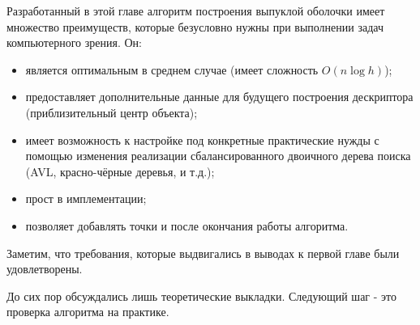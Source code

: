 Разработанный в этой главе алгоритм построения выпуклой оболочки имеет множество преимуществ, которые безусловно нужны при выполнении задач компьютерного зрения. Он:
\begin{itemize}
	\item является оптимальным в среднем случае (имеет сложность $O(n \log h)$);
	\item предоставляет дополнительные данные для будущего построения дескриптора (приблизительный центр объекта);
	\item имеет возможность к настройке под конкретные практические нужды с помощью изменения реализации сбалансированного двоичного дерева поиска (AVL, красно-чёрные деревья, и т.д.);
	\item прост в имплементации;
	\item позволяет добавлять точки и после окончания работы алгоритма.
\end{itemize}

Заметим, что требования, которые выдвигались в выводах к первой главе были удовлетворены.

До сих пор обсуждались лишь теоретические выкладки. Следующий шаг - это проверка алгоритма на практике.
